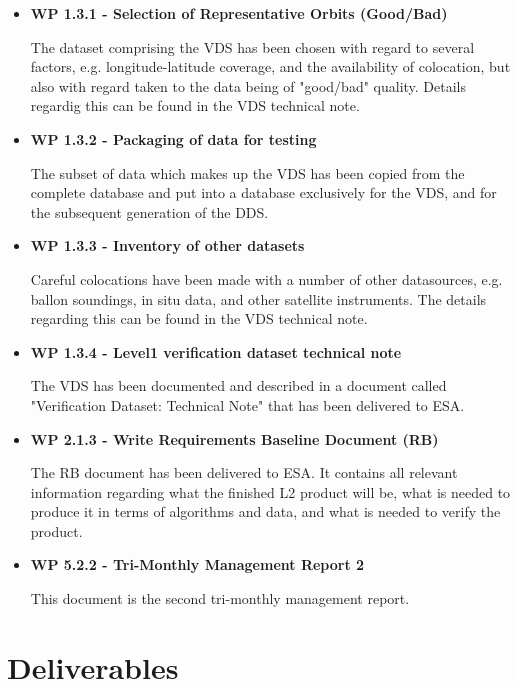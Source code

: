 \begin{itemize}
\item{\bf WP 1.3.1 - Selection of Representative Orbits (Good/Bad)}

The dataset comprising the VDS has been chosen with regard to several factors, e.g. longitude-latitude coverage, and the availability of colocation, but also with regard taken to the data being of "good/bad" quality. Details regardig this can be found in the VDS technical note. 


\item{\bf WP 1.3.2 - Packaging of data for testing}

The subset of data which makes up the VDS has been copied from the complete database and put into a database exclusively for the VDS, and for the subsequent generation of the DDS. 


\item{\bf WP 1.3.3 - Inventory of other datasets}

Careful colocations have been made with a number of other datasources, e.g. ballon soundings, in situ data, and other satellite instruments. The details regarding this can be found in the VDS technical note.


\item{\bf WP 1.3.4 - Level1 verification dataset technical note}

The VDS has been documented and described in a document called "Verification Dataset: Technical Note" that has been delivered to ESA.


\item{\bf WP 2.1.3 - Write Requirements Baseline Document (RB)}

The RB document has been delivered to ESA. It contains all relevant information regarding what the finished L2 product will be, what is needed to produce it in terms of algorithms and data, and what is needed to verify the product. 


\item{\bf WP 5.2.2 - Tri-Monthly Management Report 2}

This document is the second tri-monthly management report.


\end{itemize}



\section{Deliverables}

